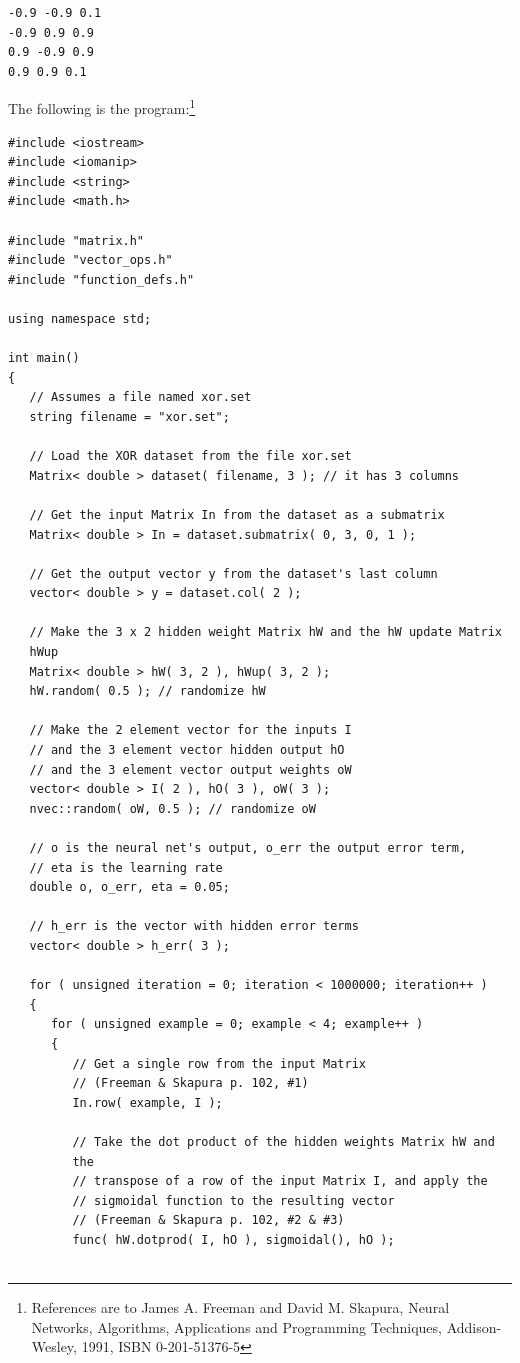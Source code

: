 \documentclass{report}
\begin{document}
\begin{verbatim}
-0.9 -0.9 0.1
-0.9 0.9 0.9
0.9 -0.9 0.9
0.9 0.9 0.1
\end{verbatim}

The following is the program:\footnote{References are to James
A. Freeman and David M. Skapura, Neural Networks, Algorithms,
Applications and Programming Techniques, Addison-Wesley, 1991, ISBN
0-201-51376-5}

\begin{verbatim}
#include <iostream>
#include <iomanip>
#include <string>
#include <math.h>

#include "matrix.h"
#include "vector_ops.h"
#include "function_defs.h"

using namespace std;

int main()
{
   // Assumes a file named xor.set
   string filename = "xor.set";

   // Load the XOR dataset from the file xor.set
   Matrix< double > dataset( filename, 3 ); // it has 3 columns

   // Get the input Matrix In from the dataset as a submatrix
   Matrix< double > In = dataset.submatrix( 0, 3, 0, 1 );

   // Get the output vector y from the dataset's last column
   vector< double > y = dataset.col( 2 );

   // Make the 3 x 2 hidden weight Matrix hW and the hW update Matrix
   hWup
   Matrix< double > hW( 3, 2 ), hWup( 3, 2 );
   hW.random( 0.5 ); // randomize hW

   // Make the 2 element vector for the inputs I
   // and the 3 element vector hidden output hO
   // and the 3 element vector output weights oW
   vector< double > I( 2 ), hO( 3 ), oW( 3 );
   nvec::random( oW, 0.5 ); // randomize oW

   // o is the neural net's output, o_err the output error term,
   // eta is the learning rate
   double o, o_err, eta = 0.05;

   // h_err is the vector with hidden error terms
   vector< double > h_err( 3 );

   for ( unsigned iteration = 0; iteration < 1000000; iteration++ )
   {
      for ( unsigned example = 0; example < 4; example++ )
      {
         // Get a single row from the input Matrix
         // (Freeman & Skapura p. 102, #1)
         In.row( example, I );

         // Take the dot product of the hidden weights Matrix hW and
         the
         // transpose of a row of the input Matrix I, and apply the
         // sigmoidal function to the resulting vector
         // (Freeman & Skapura p. 102, #2 & #3)
         func( hW.dotprod( I, hO ), sigmoidal(), hO );


\end{verbatim}
\end{document}
